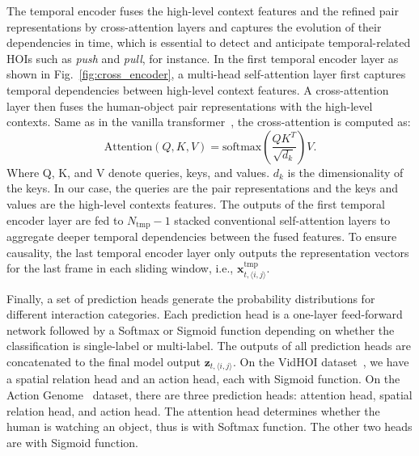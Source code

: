 \documentclass[times,twocolumn,final,authoryear]{elsarticle}
\begin{document}
The temporal encoder fuses the high-level context features and the refined pair representations by cross-attention layers and captures the evolution of their dependencies in time, which is essential to detect and anticipate temporal-related HOIs such as \emph{push} and \emph{pull}, for instance. In the first temporal encoder layer as shown in Fig.~\ref{fig:cross_encoder}, a multi-head self-attention layer first captures temporal dependencies between high-level context features. A cross-attention layer then fuses the human-object pair representations with the high-level contexts. Same as in the vanilla transformer~\citep{transformer:vanilla}, the cross-attention is computed as: 
\begin{equation}
    \text{Attention}(Q, K, V)=\text{softmax}\left(\dfrac{QK^T}{\sqrt{d_k}}\right)V\text{.}
    \label{eq:attn}
\end{equation}
Where Q, K, and V denote queries, keys, and values. $d_k$ is the dimensionality of the keys. In our case, the queries are the pair representations and the keys and values are the high-level contexts features. The outputs of the first temporal encoder layer are fed to $N_\text{tmp}-1$ stacked conventional self-attention layers to aggregate deeper temporal dependencies between the fused features. To ensure causality, the last temporal encoder layer only outputs the representation vectors for the last frame in each sliding window, i.e., $\mathbf{x}_{t,\langle i,j \rangle}^\text{tmp}$.

Finally, a set of prediction heads generate the probability distributions for different interaction categories. Each prediction head is a one-layer feed-forward network followed by a Softmax or Sigmoid function depending on whether the classification is single-label or multi-label. The outputs of all prediction heads are concatenated to the final model output $\mathbf{z}_{t,\langle i,j \rangle}$. On the VidHOI dataset~\citep{hoi_v_set:VidHOI}, we have a spatial relation head and an action head, each with Sigmoid function. On the Action Genome~\citep{hoi_v_set:action_genome} dataset, there are three prediction heads: attention head, spatial relation head, and action head. The attention head determines whether the human is watching an object, thus is with Softmax function. The other two heads are with Sigmoid function. 
\end{document}
